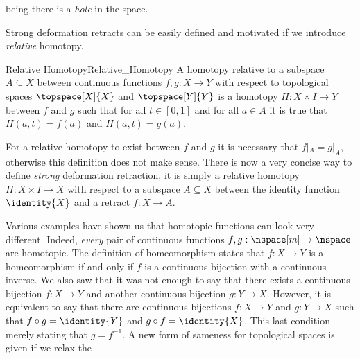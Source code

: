 \documentclass{book}                                                           %
\begin{document}
                being there is a \textit{hole} in the space.
                \par\hfill\par
                Strong deformation retracts can be easily defined and motivated
                if we introduce \textit{relative} homotopy.
                \begin{fdefinition}{Relative Homotopy}{Relative_Homotopy}
                    A homotopy relative to a subspace $A\subseteq{X}$ between
                    continuous functions $f,g:X\rightarrow{Y}$ with respect to
                    topological spaces $\topspace[X]{X}$ and $\topspace[Y]{Y}$
                    is a homotopy $H:X\times{I}\rightarrow{Y}$ between $f$ and
                    $g$ such that for all $t\in[0,1]$ and for all $a\in{A}$ it
                    is true that $H(a,t)=f(a)$ and $H(a,t)=g(a)$.
                \end{fdefinition}
                For a relative homotopy to exist between $f$ and $g$ it is
                necessary that $f|_{A}=g|_{A}$, otherwise this definition does
                not make sense. There is now a very concise way to define
                \textit{strong} deformation retraction, it is simply a relative
                homotopy $H:X\times{I}\rightarrow{X}$ with respect to a subspace
                $A\subseteq{X}$ between the identity function $\identity{X}$ and
                a retract $f:X\rightarrow{A}$.
                \par\hfill\par
                Various examples have shown us that homotopic functions can look
                very different. Indeed, \textit{every} pair of continuous
                functions $f,g:\nspace[m]\rightarrow\nspace$ are homotopic. The
                definition of homeomorphism states that $f:X\rightarrow{Y}$ is
                a homeomorphism if and only if $f$ is a continuous bijection
                with a continuous inverse. We also saw that it was not enough to
                say that there exists a continuous bijection $f:X\rightarrow{Y}$
                and another continuous bijection $g:Y\rightarrow{X}$. However,
                it is equivalent to say that there are continuous bijections
                $f:X\rightarrow{Y}$ and $g:Y\rightarrow{X}$ such that
                $f\circ{g}=\identity{Y}$ and $g\circ{f}=\identity{X}$. This last
                condition merely stating that $g=f^{\minus{1}}$. A new form of
                sameness for topological spaces is given if we relax the
\end{document}
